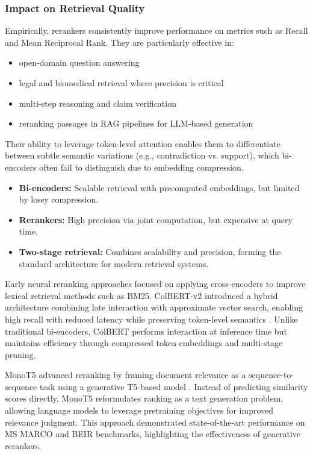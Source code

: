\subsubsection*{Impact on Retrieval Quality}

Empirically, rerankers consistently improve performance on metrics such as Recall and Mean Reciprocal Rank. They are particularly effective in:
\begin{itemize}
    \item open-domain question answering
    \item legal and biomedical retrieval where precision is critical
    \item multi-step reasoning and claim verification
    \item reranking passages in RAG pipelines for LLM-based generation
\end{itemize}

Their ability to leverage token-level attention enables them to differentiate between subtle semantic variations (e.g., contradiction vs. support), which bi-encoders often fail to distinguish due to embedding compression.

\begin{itemize}
    \item \textbf{Bi-encoders:} Scalable retrieval with precomputed embeddings, but limited by lossy compression.
    \item \textbf{Rerankers:} High precision via joint computation, but expensive at query time.
    \item \textbf{Two-stage retrieval:} Combines scalability and precision, forming the standard architecture for modern retrieval systems.
\end{itemize}


Early neural reranking approaches focused on applying cross-encoders to improve lexical retrieval methods such as BM25. ColBERT-v2 introduced a hybrid architecture combining late interaction with approximate vector search, enabling high recall with reduced latency while preserving token-level semantics \cite{colbertv2}. Unlike traditional bi-encoders, ColBERT performs interaction at inference time but maintains efficiency through compressed token embeddings and multi-stage pruning.

MonoT5 advanced reranking by framing document relevance as a sequence-to-sequence task using a generative T5-based model \cite{monot5}. Instead of predicting similarity scores directly, MonoT5 reformulates ranking as a text generation problem, allowing language models to leverage pretraining objectives for improved relevance judgment. This approach demonstrated state-of-the-art performance on MS MARCO and BEIR benchmarks, highlighting the effectiveness of generative rerankers.

